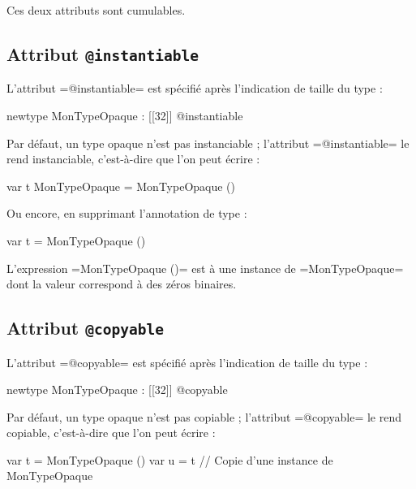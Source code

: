 Ces deux attributs sont cumulables.

\subsection{Attribut \texttt{@instantiable}}

L'attribut \omnibus=@instantiable= est spécifié après l'indication de taille du type :

\begin{OMNIBUS}
newtype MonTypeOpaque : [[32]] @instantiable
\end{OMNIBUS}


Par défaut, un type opaque n'est pas instanciable ; l'attribut \omnibus=@instantiable= le rend instanciable, c'est-à-dire que l'on peut écrire :

\begin{OMNIBUS}
var t MonTypeOpaque = MonTypeOpaque ()
\end{OMNIBUS}

Ou encore, en supprimant l'annotation de type :

\begin{OMNIBUS}
var t = MonTypeOpaque ()
\end{OMNIBUS}

L'expression \omnibus=MonTypeOpaque ()= est à une instance de \omnibus=MonTypeOpaque= dont la valeur correspond à des zéros binaires.






\subsection{Attribut \texttt{@copyable}}

L'attribut \omnibus=@copyable= est spécifié après l'indication de taille du type :

\begin{OMNIBUS}
newtype MonTypeOpaque : [[32]] @copyable
\end{OMNIBUS}


Par défaut, un type opaque n'est pas copiable ; l'attribut \omnibus=@copyable= le rend copiable, c'est-à-dire que l'on peut écrire :

\begin{OMNIBUS}
var t = MonTypeOpaque ()
var u = t // Copie d'une instance de MonTypeOpaque
\end{OMNIBUS}


